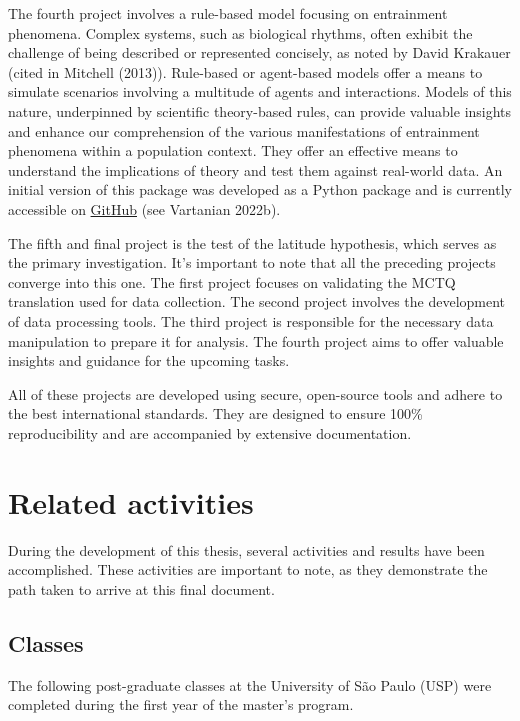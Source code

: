 \documentclass[
  12pt,
  a4paper,
  oneside]{tesesusp}
\begin{document}
The fourth project involves a rule-based model focusing on entrainment
phenomena. Complex systems, such as biological rhythms, often exhibit
the challenge of being described or represented concisely, as noted by
David Krakauer (cited in Mitchell (2013)). Rule-based or agent-based
models offer a means to simulate scenarios involving a multitude of
agents and interactions. Models of this nature, underpinned by
scientific theory-based rules, can provide valuable insights and enhance
our comprehension of the various manifestations of entrainment phenomena
within a population context. They offer an effective means to understand
the implications of theory and test them against real-world data. An
initial version of this package was developed as a Python package and is
currently accessible on
\href{https://entrainment.readthedocs.io/en/latest/index.html}{GitHub}
(see Vartanian 2022b).

The fifth and final project is the test of the latitude hypothesis,
which serves as the primary investigation. It's important to note that
all the preceding projects converge into this one. The first project
focuses on validating the MCTQ translation used for data collection. The
second project involves the development of data processing tools. The
third project is responsible for the necessary data manipulation to
prepare it for analysis. The fourth project aims to offer valuable
insights and guidance for the upcoming tasks.

All of these projects are developed using secure, open-source tools and
adhere to the best international standards. They are designed to ensure
100\% reproducibility and are accompanied by extensive documentation.

\hypertarget{related-activities}{%
\section{Related activities}\label{related-activities}}

During the development of this thesis, several activities and results
have been accomplished. These activities are important to note, as they
demonstrate the path taken to arrive at this final document.

\hypertarget{classes}{%
\subsection{Classes}\label{classes}}

The following post-graduate classes at the University of São Paulo (USP)
were completed during the first year of the master's program.
\end{document}
